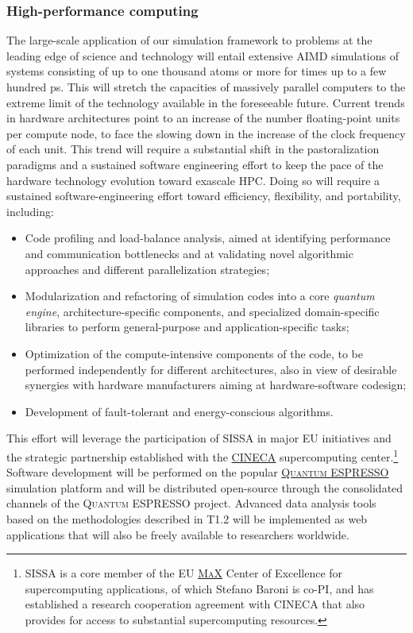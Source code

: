 \salta\subsubsection{High-performance computing}
The large-scale application of our simulation framework to problems at the leading edge of science and technology will entail extensive AIMD simulations of systems consisting of up to one thousand atoms or more for times up to a few hundred ps. This will stretch the capacities of massively parallel computers to the extreme limit of the technology available in the foreseeable future. Current trends in hardware architectures point to an increase of the number floating-point units per compute node, to face the slowing down in the increase of the clock frequency of each unit. This trend will require a substantial shift in the pastoralization paradigms and a sustained software engineering effort to keep the pace of the hardware technology evolution toward exascale HPC. Doing so will require a sustained software-engineering effort toward efficiency, flexibility, and portability, including: 
\begin{itemize}
\item Code profiling and load-balance analysis, aimed at identifying performance and communication bottlenecks and at validating novel algorithmic approaches and different parallelization strategies;
\item Modularization and refactoring of simulation codes into a core \emph{quantum engine}, architecture-specific components, and specialized domain-specific libraries to perform general-purpose and application-specific tasks;
\item Optimization of the compute-intensive components of the code, to be performed  independently for different architectures, also in view of desirable synergies with hardware manufacturers aiming at hardware-software codesign;
\item Development of fault-tolerant and energy-conscious algorithms.
\end{itemize}

This effort will leverage the participation of SISSA in major EU initiatives and the strategic partnership established with the \href{http://www.cineca.it}{CINECA} supercomputing center.\footnote{SISSA is a core member of the EU \href{http://www.max-centre.eu}{\textsc{MaX}} Center of Excellence for supercomputing applications, of which Stefano Baroni is co-PI, and has established a research cooperation agreement with CINECA that also provides for access to substantial supercomputing resources.} Software development will be performed on the popular \href{http://www.quantum-espresso.org}{\textsc{Quantum ESPRESSO}} simulation platform and will be distributed open-source through the consolidated channels of the \textsc{Quantum ESPRESSO} project. Advanced data analysis tools based on the methodologies described in T1.2 will be implemented as web applications that will also be freely available to researchers worldwide.

